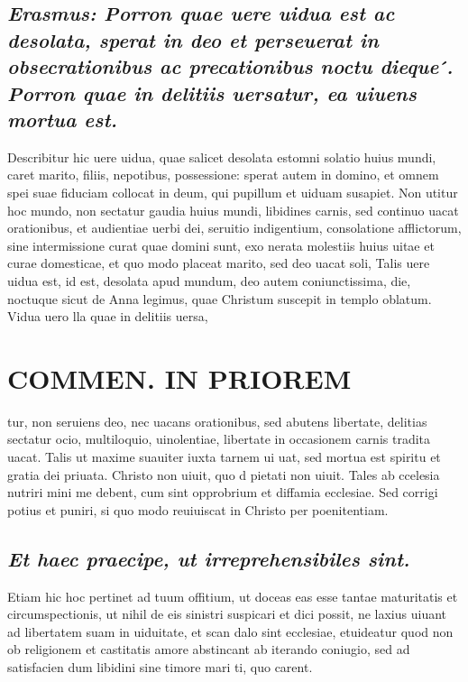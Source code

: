 \documentclass{article}
\begin{document}
\begin{pages}
\subsection*{\textit{Erasmus: Porron quae uere uidua est ac desolata, sperat in deo et perseuerat in obsecrationibus ac precationibus noctu dieque ́. Porron quae in delitiis uersatur, ea uiuens mortua est. }}\pstart Describitur hic uere uidua, quae salicet desolata estomni solatio huius mundi, caret marito, filiis, nepotibus, possessione: sperat autem in domino, et omnem spei suae fiduciam collocat in deum, qui pupillum et uiduam susapiet. Non utitur hoc mundo, non sectatur gaudia huius mundi, libidines carnis, sed continuo uacat orationibus, et audientiae uerbi dei, seruitio indigentium, consolatione afflictorum, sine intermissione curat quae domini sunt, exo nerata molestiis huius uitae et curae domesticae, et quo modo placeat marito, sed deo uacat soli, Talis uere uidua est, id est, desolata apud mundum, deo autem coniunctissima, die, noctuque sicut de Anna legimus, quae Christum suscepit in templo oblatum. Vidua uero lla quae in delitiis uersa,  \pend
\section*{COMMEN. IN PRIOREM }
\marginpar{[ p.120 ]}\pstart tur, non seruiens deo, nec uacans orationibus, sed abutens libertate, delitias sectatur ocio, multiloquio, uinolentiae, libertate in occasionem carnis tradita uacat. Talis ut maxime suauiter iuxta tarnem ui uat, sed mortua est spiritu et gratia dei priuata. Christo non uiuit, quo d pietati non uiuit. Tales ab ccelesia nutriri mini me debent, cum sint opprobrium et diffamia ecclesiae. Sed corrigi potius et puniri, si quo modo reuiuiscat in Christo per poenitentiam.  \pend
{}
{}
\subsection*{\textit{Et haec praecipe, ut irreprehensibiles sint. }}\pstart Etiam hic hoc pertinet ad tuum offitium, ut doceas eas esse tantae maturitatis et circumspectionis, ut nihil de eis sinistri suspicari et dici possit, ne laxius uiuant ad libertatem suam in uiduitate, et scan dalo sint ecclesiae, etuideatur quod non ob religionem et castitatis amore abstincant ab iterando coniugio, sed ad satisfacien dum libidini sine timore mari ti, quo carent.  \pend
{}
{}

\end{pages}
\end{document}
